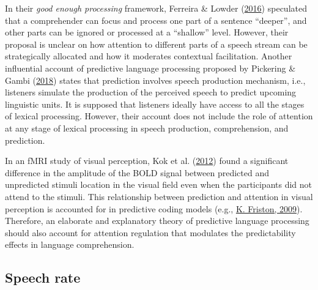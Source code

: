 \documentclass[a4paper, nobind]{templates/ociamthesis}
\begin{document}
In their \emph{good enough processing} framework, Ferreira \& Lowder (\protect\hyperlink{ref-Ferreira2016}{2016}) speculated that a comprehender can focus and process one part of a sentence ``deeper'',
and other parts can be ignored or processed at a ``shallow'' level.
However, their proposal is unclear on how attention to different parts of a speech stream can be strategically allocated
and how it moderates contextual facilitation.
Another influential account of predictive language processing proposed by Pickering \& Gambi (\protect\hyperlink{ref-Pickering2018}{2018}) states that prediction involves speech production mechanism,
i.e., listeners simulate the production of the perceived speech to predict upcoming linguistic units.
It is supposed that listeners ideally have access to all the stages of lexical processing.
However, their account does not include the role of attention at any stage of lexical processing in speech production, comprehension, and prediction.

In an fMRI study of visual perception, Kok et al. (\protect\hyperlink{ref-Kok2012}{2012}) found a significant difference in the amplitude of the BOLD signal between predicted and unpredicted stimuli location in the visual field even when the participants did not attend to the stimuli.
This relationship between prediction and attention in visual perception is accounted for in predictive coding models (e.g., \protect\hyperlink{ref-Friston2009}{K. Friston, 2009}).
Therefore, an elaborate and explanatory theory of predictive language processing should also account for attention regulation that modulates the predictability effects in language comprehension.

\hypertarget{speech-rate}{%
\subsection{Speech rate}\label{speech-rate}}
\end{document}
